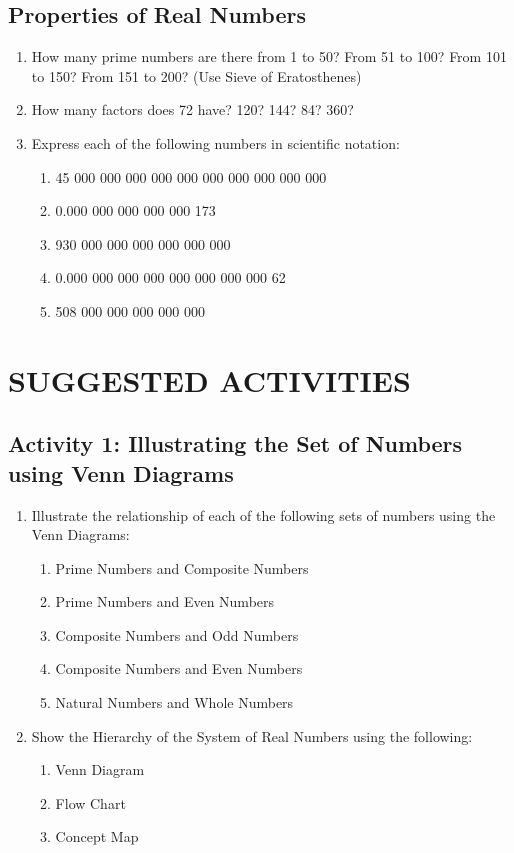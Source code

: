 \subsection*{Properties of Real Numbers}
\begin{enumerate}
\item How many prime numbers are there from 1 to 50? From 51 to 100? From 101 to 150? From 151
to 200? (Use Sieve of Eratosthenes)
\item How many factors does 72 have? 120? 144? 84? 360?
\item Express each of the following numbers in scientific notation:
	\begin{enumerate}
	\item 45 000 000 000 000 000 000 000 000 000 000
	\item 0.000 000 000 000 000 173
	\item 930 000 000 000 000 000 000
	\item 0.000 000 000 000 000 000 000 000 62
	\item 508 000 000 000 000 000
	\end{enumerate}
\end{enumerate}

\section*{SUGGESTED ACTIVITIES}
\subsection*{Activity 1: Illustrating the Set of Numbers using Venn Diagrams}
\begin{enumerate}
\item Illustrate the relationship of each of the following sets of numbers using the Venn
Diagrams:
	\begin{enumerate}
	\item Prime Numbers and Composite Numbers
	\item Prime Numbers and Even Numbers
	\item Composite Numbers and Odd Numbers
	\item Composite Numbers and Even Numbers
	\item Natural Numbers and Whole Numbers
	\end{enumerate}
\item Show the Hierarchy of the System of Real Numbers using the following:
	\begin{enumerate}
	\item Venn Diagram
	\item Flow Chart
	\item Concept Map
	\end{enumerate}
\end{enumerate}

